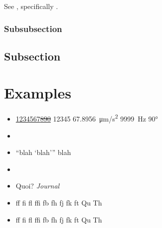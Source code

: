 \documentclass[a4paper, 10pt, twocolumn]{lt_article}
\begin{document}
\blindtext
See , specifically .

\subsubsection{Subsubsection}
\Blindtext[1]

\subsection{Subsection} %

\Blindtext[2]



\newrefcontext[sorting=nyt]
\printbibliography

\newpage
\section{Examples} %
\label{sec:Examples}

\textrm{\blindtext}

\textit{\blindtext}

\textbf{\blindtext}

\textsc{\blindtext}

\newpage

\textsf{\blindtext}

\textsf{\textit{\blindtext}}

\textsf{\textbf{\blindtext}}

\texttt{\blindtext}

\newpage

\begin{itemize}

    \item \uline{1234567\sout{890}} \num{12345} \SI{67.8956}{\um/\s^2}
        \SI{9999}{\hertz} \ang{90}

    \item \LuaTeX\ \LuaLaTeX

    \item \enquote{blah \enquote{blah}} blah

    \item \eg \ie \cf \etc

    \item Quoi? \textit{Journal}

    \item ff fi fl ffi fb fh fj fk ft Qu Th

    \item \textsf{ff fi fl ffi fb fh fj fk ft Qu Th}

\end{itemize}

\end{document}
